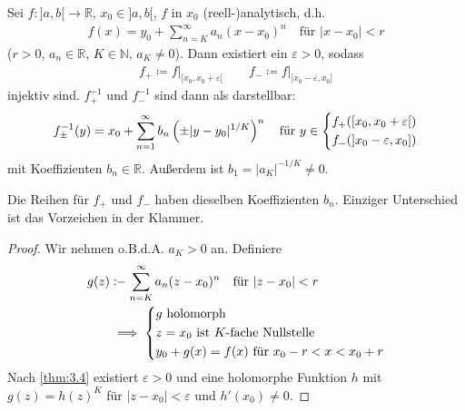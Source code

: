 \begin{theorem}[Satz]
  Sei $f : ]a,b[ \to \mathbb{R}$, $x_0 \in ]a,b[$, $f$ in $x_0$ (reell-)analytisch, d.h.
  \begin{align*}
    f(x) = y_0 + \sum\limits_{n=K}^{\infty} a_n (x-x_0)^n \quad \text{für } |x-x_0| < r
  \end{align*}
  ($r>0$, $a_n \in \mathbb{R}$, $K \in \mathbb{N}$, $a_K \neq 0$). Dann existiert ein $\varepsilon > 0$, sodass
  \begin{align*}
    f_{+} \coloneq f \Big|_{[x_0,x_0+\varepsilon[} \qquad f_{-} \coloneq f \Big|_{]x_0-\varepsilon,x_0]}
  \end{align*}
  injektiv sind. 
  $f_{+}^{-1}$ und $f_{-}^{-1}$ sind dann als  darstellbar:
  \begin{align*}
    f_{\pm}^{-1}(y) = x_0 + \sum\limits_{n=1}^{\infty} b_n \left( \pm |y-y_0|^{1/K} \right)^n
    \quad \text{für } y \in 
    \begin{dcases}
      f_{+}([x_0,x_0+\varepsilon[) \\
      f_{-}(]x_0-\varepsilon,x_0])
    \end{dcases}
  \end{align*}
  mit Koeffizienten $b_n \in \mathbb{R}$.
  Außerdem ist $b_1 = |a_K|^{-1/K} \neq 0$.

  Die Reihen für $f_{+}$ und $f_{-}$ haben dieselben Koeffizienten $b_n$. Einziger Unterschied ist das Vorzeichen in der Klammer.
  
  \begin{proof} %
    Wir nehmen o.B.d.A. $a_K > 0$ an. Definiere
    \begin{align*}
      g(z) &\coloneq \sum\limits_{n=K}^{\infty} a_n (z-x_0)^n \quad \text{für } |z-x_0| < r \\
      &\implies
      \begin{dcases}
        g \text{ holomorph} \\
        z = x_0 \text{ ist $K$-fache Nullstelle} \\
        y_0 + g(x) = f(x) \text{ für } x_0 - r < x < x_0 + r
      \end{dcases}
    \end{align*}
    Nach \ref{thm:3.4} existiert $\varepsilon > 0$ und eine holomorphe Funktion $h$ mit $g(z) = h(z)^K$ für $|z-x_0| < \varepsilon$ und $h'(x_0) \neq 0$.
    

\end{proof}
\end{theorem}
